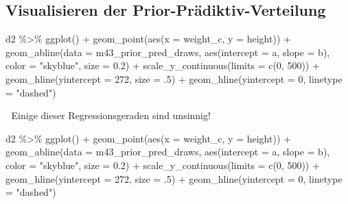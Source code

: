 \documentclass[
  a4paper,
  DIV=11]{scrreprt}
\newenvironment{Shaded}{\begin{snugshade}}{\end{snugshade}}
\newcommand{\AttributeTok}[1]{\textcolor[rgb]{0.40,0.45,0.13}{#1}}
\newcommand{\DecValTok}[1]{\textcolor[rgb]{0.68,0.00,0.00}{#1}}
\newcommand{\FloatTok}[1]{\textcolor[rgb]{0.68,0.00,0.00}{#1}}
\newcommand{\FunctionTok}[1]{\textcolor[rgb]{0.28,0.35,0.67}{#1}}
\newcommand{\NormalTok}[1]{\textcolor[rgb]{0.00,0.23,0.31}{#1}}
\newcommand{\SpecialCharTok}[1]{\textcolor[rgb]{0.37,0.37,0.37}{#1}}
\newcommand{\StringTok}[1]{\textcolor[rgb]{0.13,0.47,0.30}{#1}}
\theoremstyle{definition}
\theoremstyle{remark}
\begin{document}
\hypertarget{visualisieren-der-prior-pruxe4diktiv-verteilung}{%
\subsection{Visualisieren der
Prior-Prädiktiv-Verteilung}\label{visualisieren-der-prior-pruxe4diktiv-verteilung}}

\begin{Shaded}
\begin{Highlighting}[]
\NormalTok{d2 }\SpecialCharTok{\%\textgreater{}\%} \FunctionTok{ggplot}\NormalTok{() }\SpecialCharTok{+}
  \FunctionTok{geom\_point}\NormalTok{(}\FunctionTok{aes}\NormalTok{(}\AttributeTok{x =}\NormalTok{ weight\_c, }\AttributeTok{y =}\NormalTok{ height)) }\SpecialCharTok{+} 
  \FunctionTok{geom\_abline}\NormalTok{(}\AttributeTok{data =}\NormalTok{ m43\_prior\_pred\_draws,}
\FunctionTok{aes}\NormalTok{(}\AttributeTok{intercept =}\NormalTok{ a, }\AttributeTok{slope =}\NormalTok{ b), }\AttributeTok{color =} \StringTok{"skyblue"}\NormalTok{, }\AttributeTok{size =} \FloatTok{0.2}\NormalTok{) }\SpecialCharTok{+}
  \FunctionTok{scale\_y\_continuous}\NormalTok{(}\AttributeTok{limits =} \FunctionTok{c}\NormalTok{(}\DecValTok{0}\NormalTok{, }\DecValTok{500}\NormalTok{)) }\SpecialCharTok{+}
  \FunctionTok{geom\_hline}\NormalTok{(}\AttributeTok{yintercept =} \DecValTok{272}\NormalTok{, }\AttributeTok{size =}\NormalTok{ .}\DecValTok{5}\NormalTok{) }\SpecialCharTok{+}
  \FunctionTok{geom\_hline}\NormalTok{(}\AttributeTok{yintercept =} \DecValTok{0}\NormalTok{, }\AttributeTok{linetype =} \StringTok{"dashed"}\NormalTok{)}
\end{Highlighting}
\end{Shaded}

🤯 Einige dieser Regressionsgeraden sind unsinnig!

\begin{Shaded}
\begin{Highlighting}[]
\NormalTok{d2 }\SpecialCharTok{\%\textgreater{}\%} \FunctionTok{ggplot}\NormalTok{() }\SpecialCharTok{+}
  \FunctionTok{geom\_point}\NormalTok{(}\FunctionTok{aes}\NormalTok{(}\AttributeTok{x =}\NormalTok{ weight\_c, }\AttributeTok{y =}\NormalTok{ height)) }\SpecialCharTok{+} 
  \FunctionTok{geom\_abline}\NormalTok{(}\AttributeTok{data =}\NormalTok{ m43\_prior\_pred\_draws,}
\FunctionTok{aes}\NormalTok{(}\AttributeTok{intercept =}\NormalTok{ a, }\AttributeTok{slope =}\NormalTok{ b), }\AttributeTok{color =} \StringTok{"skyblue"}\NormalTok{, }\AttributeTok{size =} \FloatTok{0.2}\NormalTok{) }\SpecialCharTok{+}
  \FunctionTok{scale\_y\_continuous}\NormalTok{(}\AttributeTok{limits =} \FunctionTok{c}\NormalTok{(}\DecValTok{0}\NormalTok{, }\DecValTok{500}\NormalTok{)) }\SpecialCharTok{+}
  \FunctionTok{geom\_hline}\NormalTok{(}\AttributeTok{yintercept =} \DecValTok{272}\NormalTok{, }\AttributeTok{size =}\NormalTok{ .}\DecValTok{5}\NormalTok{) }\SpecialCharTok{+}
  \FunctionTok{geom\_hline}\NormalTok{(}\AttributeTok{yintercept =} \DecValTok{0}\NormalTok{, }\AttributeTok{linetype =} \StringTok{"dashed"}\NormalTok{)}
\end{Highlighting}
\end{Shaded}
\end{document}
